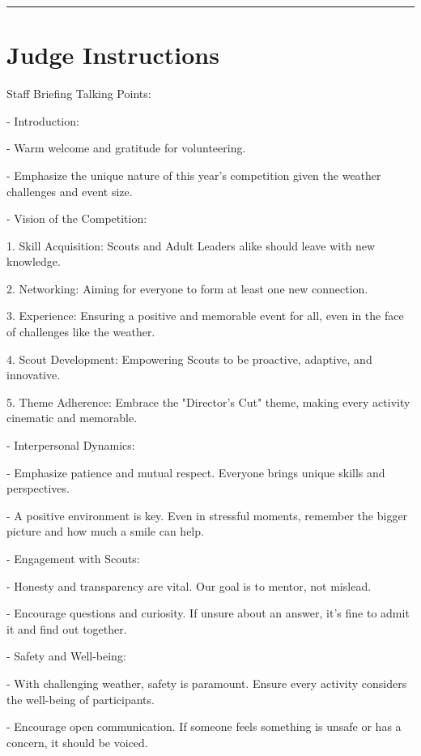 \documentclass[10pt]{article}
\begin{document}
	\vspace{0.5cm}
	\hrule
	\vspace{0.5cm}

		\section*{Judge Instructions}
		Staff Briefing Talking Points:



- Introduction:

  - Warm welcome and gratitude for volunteering.

  - Emphasize the unique nature of this year's competition given the weather challenges and event size.



- Vision of the Competition:

  1. Skill Acquisition: Scouts and Adult Leaders alike should leave with new knowledge.

  2. Networking: Aiming for everyone to form at least one new connection.

  3. Experience: Ensuring a positive and memorable event for all, even in the face of challenges like the weather.

  4. Scout Development: Empowering Scouts to be proactive, adaptive, and innovative.

  5. Theme Adherence: Embrace the "Director's Cut" theme, making every activity cinematic and memorable.



- Interpersonal Dynamics:

  - Emphasize patience and mutual respect. Everyone brings unique skills and perspectives.

  - A positive environment is key. Even in stressful moments, remember the bigger picture and how much a smile can help.



- Engagement with Scouts:

  - Honesty and transparency are vital. Our goal is to mentor, not mislead.

  - Encourage questions and curiosity. If unsure about an answer, it's fine to admit it and find out together.



- Safety and Well-being:

  - With challenging weather, safety is paramount. Ensure every activity considers the well-being of participants.

  - Encourage open communication. If someone feels something is unsafe or has a concern, it should be voiced.
\end{document}
